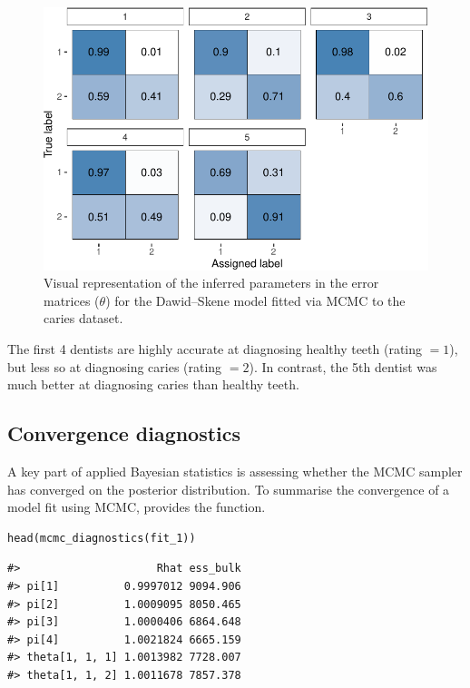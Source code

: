 \begin{figure}

{\centering \includegraphics{RJ-2023-064_files/figure-latex/plot-theta-caries-1} 

}

\caption{Visual representation of the inferred parameters in the error matrices ($\theta$) for the Dawid--Skene model fitted via MCMC to the caries dataset.}\label{fig:plot-theta-caries}
\end{figure}

The first 4 dentists are highly accurate at diagnosing healthy teeth (rating \(= 1\)), but less so at diagnosing caries (rating \(= 2\)). In contrast, the 5th
dentist was much better at diagnosing caries than healthy teeth.

\hypertarget{sec:convergence-diagnostics}{%
\subsection{Convergence diagnostics}\label{sec:convergence-diagnostics}}

A key part of applied Bayesian statistics is assessing whether the
MCMC sampler has converged on the posterior distribution. To summarise the
convergence of a model fit using MCMC,  provides the
 function.

\begin{verbatim}
head(mcmc_diagnostics(fit_1))
\end{verbatim}

\begin{verbatim}
#>                     Rhat ess_bulk
#> pi[1]          0.9997012 9094.906
#> pi[2]          1.0009095 8050.465
#> pi[3]          1.0000406 6864.648
#> pi[4]          1.0021824 6665.159
#> theta[1, 1, 1] 1.0013982 7728.007
#> theta[1, 1, 2] 1.0011678 7857.378
\end{verbatim}

